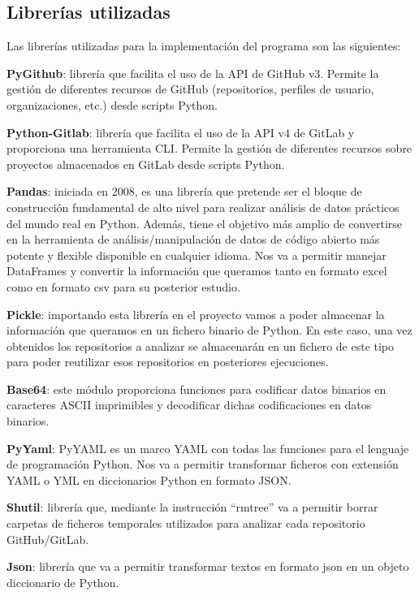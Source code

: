 \subsection{Librerías utilizadas}
Las librerías utilizadas para la implementación del programa son las siguientes:
\begin{compactitem}
    \item \textbf{PyGithub}: librería que facilita el uso de la API de GitHub v3. Permite la gestión de diferentes recursos de GitHub (repositorios, perfiles de usuario, organizaciones, etc.) desde scripts Python.
    \item \textbf{Python-Gitlab}: librería que facilita el uso de la API v4 de GitLab y proporciona una herramienta CLI. Permite la gestión de diferentes recursos sobre proyectos almacenados en GitLab desde scripts Python.
    \item \textbf{Pandas}: iniciada en 2008, es una librería que pretende ser el bloque de construcción fundamental de alto nivel para realizar análisis de datos prácticos del mundo real en Python. Además, tiene el objetivo más amplio de convertirse en la herramienta de análisis/manipulación de datos de código abierto más potente y flexible disponible en cualquier idioma. Nos va a permitir manejar DataFrames y convertir la información que queramos tanto en formato excel como en formato csv para su posterior estudio.
    \item \textbf{Pickle}: importando esta librería en el proyecto vamos a poder almacenar la información que queramos en un fichero binario de Python. En este caso, una vez obtenidos los repositorios a analizar se almacenarán en un fichero de este tipo para poder reutilizar esos repositorios en posteriores ejecuciones.
    \item \textbf{Base64}: este módulo proporciona funciones para codificar datos binarios en caracteres ASCII imprimibles y decodificar dichas codificaciones en datos binarios.
    \item \textbf{PyYaml}: PyYAML es un marco YAML con todas las funciones para el lenguaje de programación Python. Nos va a permitir transformar ficheros con extensión YAML o YML en diccionarios Python en formato JSON.
    \item \textbf{Shutil}: librería que, mediante la instrucción ``rmtree'' va a permitir borrar carpetas de ficheros temporales utilizados para analizar cada repositorio GitHub/GitLab.
    \item \textbf{Json}: librería que va a permitir transformar textos en formato json en un objeto diccionario de Python.
\end{compactitem}

